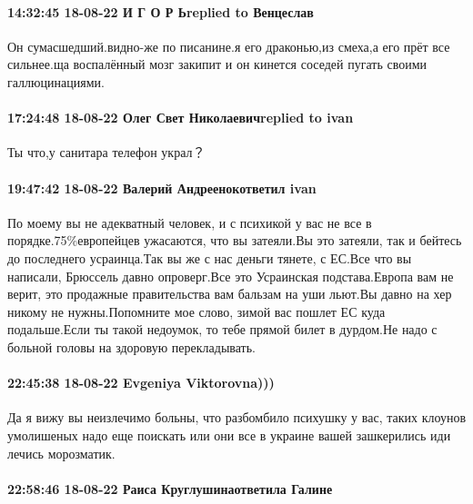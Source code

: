  
 
 
 
 

\paragraph{14:32:45 18-08-22 И Г О Р Ьreplied to Венцеслав}

Он сумасшедший.видно-же по писанине.я его драконью,из смеха,а его прёт все
сильнее.ща воспалённый мозг закипит и он кинется соседей пугать своими
галлюцинациями.

\paragraph{17:24:48 18-08-22 Олег Свет Николаевичreplied to ivan}

Ты что,у санитара телефон украл？

\paragraph{19:47:42 18-08-22 Валерий Андреенокответил ivan}

По моему вы не адекватный человек, и с психикой у вас не все в
порядке.75\%европейцев ужасаются, что вы затеяли.Вы это затеяли, так и бейтесь
до последнего усраинца.Так вы же с нас деньги тянете, с ЕС.Все что вы написали,
Брюссель давно опроверг.Все это Усраинская подстава.Европа вам не верит, это
продажные правительства вам бальзам на уши льют.Вы давно на хер никому не
нужны.Попомните мое слово, зимой вас пошлет ЕС куда подальше.Если ты такой
недоумок, то тебе прямой билет в дурдом.Не надо с больной головы на здоровую
перекладывать.

\paragraph{22:45:38 18-08-22 Evgeniya Viktorovna)))}

Да я вижу вы неизлечимо больны, что разбомбило психушку у вас, таких клоунов
умолишеных надо еще поискать или они все в украине вашей зашкерились иди лечись
морозматик.

\paragraph{22:58:46 18-08-22 Раиса Круглушинаответила Галине}

